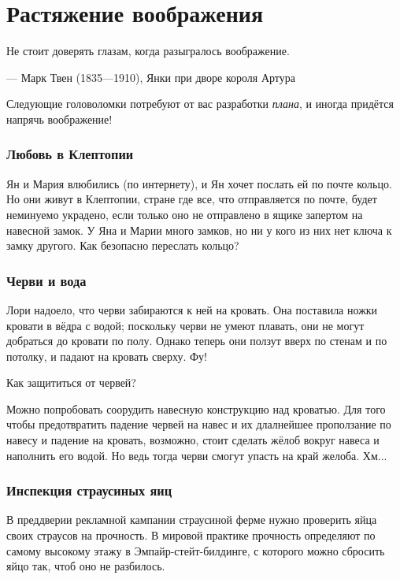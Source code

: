 \chapter{Растяжение воображения}


\setlength{\epigraphwidth}{.80\textwidth}
\epigraph{Не стоит доверять глазам, когда разыгралось воображение.
}{--- Марк Твен (1835---1910), Янки при дворе короля Артура}

Следующие головоломки потребуют от вас разработки \emph{плана},
и иногда придётся напрячь воображение!

\subsection*{Любовь в Клептопии}

Ян и Мария влюбились (по интернету), и Ян хочет послать ей по почте кольцо.
Но они живут в Клептопии, стране где все, что отправляется по почте, будет неминуемо украдено, если только оно не отправлено в ящике запертом на навесной замок.
У Яна и Марии много замков, но ни у кого из них нет ключа к замку другого.
Как безопасно переслать кольцо?

\subsection*{Черви и вода}

Лори надоело, что черви забираются к ней на кровать.
Она поставила ножки кровати в вёдра с водой;
поскольку черви не умеют плавать, они не могут добраться до кровати по полу.
Однако теперь они ползут вверх по стенам и по потолку, и падают на кровать сверху.
Фу!

Как защититься от червей?

Можно попробовать соорудить навесную конструкцию над кроватью.
Для того чтобы предотвратить падение червей на навес и их длалнейшее проползание по навесу и падение на кровать, возможно, стоит сделать жёлоб вокруг навеса и наполнить его водой.
Но ведь тогда черви смогут упасть на край желоба.
Хм...

\subsection*{Инспекция страусиных яиц}

В преддверии рекламной кампании страусиной ферме нужно проверить яйца своих страусов на прочность.
В мировой практике прочность определяют по самому высокому этажу в Эмпайр-стейт-билдинге, с которого можно сбросить яйцо так, чтоб оно не разбилось.

